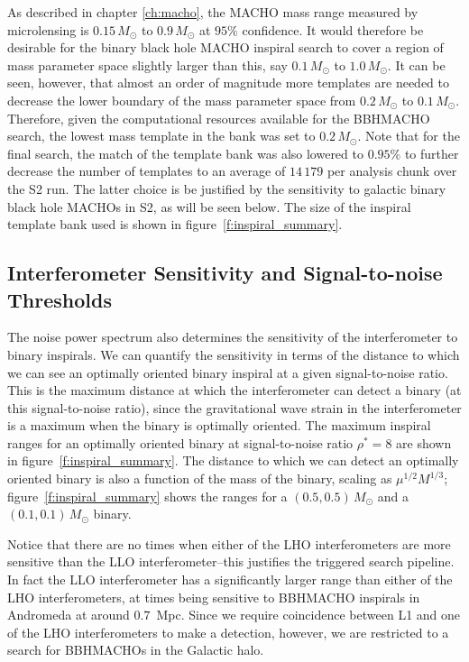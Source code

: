 As described in chapter \ref{ch:macho}, the MACHO mass range measured by
microlensing is $0.15\,M_\odot$ to $0.9\,M_\odot$ at $95\%$ confidence. It
would therefore be desirable for the binary black hole MACHO inspiral search
to cover a region of mass parameter space slightly larger than this, say
$0.1\,M_\odot$ to $1.0\,M_\odot$.  It can be seen, however, that almost an
order of magnitude more templates are needed to decrease the lower boundary of
the mass parameter space from $0.2\,M_\odot$ to $0.1\,M_\odot$.  Therefore,
given the computational resources available for the BBHMACHO search, the
lowest mass template in the bank was set to $0.2\,M_\odot$. Note that for the
final search, the match of the template bank was also lowered to $0.95\%$ to
further decrease the number of templates to an average of $14\,179$ per
analysis chunk over the S2 run.  The latter choice is be justified by the
sensitivity to galactic binary black hole MACHOs in S2, as will be seen below.
The size of the inspiral template bank used is shown in
figure~\ref{f:inspiral_summary}.
 
\subsection{Interferometer Sensitivity and Signal-to-noise Thresholds}
\label{ss:snrthreshold}

The noise power spectrum also determines the sensitivity of the interferometer
to binary inspirals. We can quantify the sensitivity in terms of the distance
to which we can see an optimally oriented binary inspiral at a given
signal-to-noise ratio. This is the maximum distance at which the
interferometer can detect a binary (at this signal-to-noise ratio), since the
gravitational wave strain in the interferometer is a maximum when the binary
is optimally oriented.  The maximum inspiral ranges for an optimally oriented
binary at signal-to-noise ratio $\rho^\ast = 8$ are shown in
figure~\ref{f:inspiral_summary}.  The distance to which we can detect an
optimally oriented binary is also a function of the mass of the binary,
scaling as $\mu^{1/2}M^{1/3}$; figure~\ref{f:inspiral_summary} shows the
ranges for a $(0.5,0.5)\,M_\odot$ and a $(0.1,0.1)\,M_\odot$ binary.

Notice that there are no times when either of the LHO interferometers are more
sensitive than the LLO interferometer--this justifies the triggered search
pipeline. In fact the LLO interferometer has a significantly larger range than
either of the LHO interferometers, at times being sensitive to BBHMACHO
inspirals in Andromeda at around $0.7$~Mpc.  Since we require coincidence
between L1 and one of the LHO interferometers to make a detection, however, we
are restricted to a search for BBHMACHOs in the Galactic halo.  

